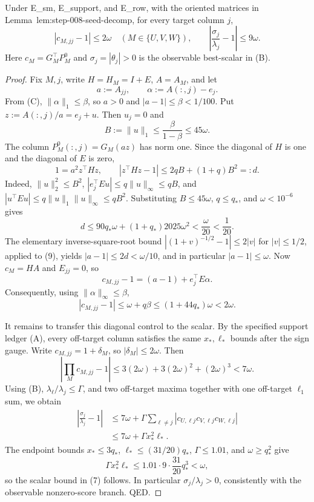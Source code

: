 \begin{lemma}\label{lem:step-008-best-scalar}
Under
E\_sm, E\_support, and E\_row, with the oriented matrices in
Lemma~lem:step-008-seed-decomp, for every target column $j$,
\[
 |c_{M,jj}-1|\le2\omega\quad(M\in\{U,V,W\}),\qquad
 \left|\frac{\sigma_j}{\lambda_j}-1\right|\le9\omega. \tag{7}
\]
Here $c_M=G_M^\top P_M^0$ and $\sigma_j=|\theta_j|>0$ is the observable
best-scalar in (B).

\begin{proof}

Fix $M,j$, write $H=H_M=I+E$, $A=A_M$, and let
\[
 a:=A_{jj},\qquad \alpha:=A(:,j)-e_j.
\]
From (C), $\|\alpha\|_1\le\beta$, so $a>0$ and
$|a-1|\le\beta<1/100$. Put $z:=A(:,j)/a=e_j+u$. Then $u_j=0$ and
\[
 B:=\|u\|_1\le\frac{\beta}{1-\beta}\le45\omega. \tag{8}
\]
The column $P_M^0(:,j)=G_M(az)$ has norm one. Since the diagonal of $H$
is one and the diagonal of $E$ is zero,
\[
 1=a^2 z^\top H z,\qquad
 |z^\top H z-1|\le2qB+(1+q)B^2=:d. \tag{9}
\]
Indeed, $\|u\|_2^2\le B^2$, $|e_j^\top Eu|\le q\|u\|_\infty\le qB$,
and $|u^\top Eu|\le q\|u\|_1\|u\|_\infty\le qB^2$. Substituting
$B\le45\omega$, $q\le q_*$, and $\omega<10^{-6}$ gives
\[
 d\le90q_*\omega+(1+q_*)2025\omega^2<\frac{\omega}{20}<\frac1{20}. \tag{10}
\]
The elementary inverse-square-root bound
$|(1+v)^{-1/2}-1|\le2|v|$ for $|v|\le1/2$, applied to (9), yields
$|a-1|\le2d<\omega/10$, and in particular $|a-1|\le\omega$. Now
$c_M=HA$ and $E_{jj}=0$, so
\[
 c_{M,jj}-1=(a-1)+e_j^\top E\alpha.
\]
Consequently, using $\|\alpha\|_\infty\le\beta$,
\[
 |c_{M,jj}-1|\le\omega+q\beta
 \le(1+44q_*)\omega<2\omega. \tag{11}
\]

It remains to transfer this diagonal control to the scalar. By the specified support ledger (A), every off-target column satisfies the same $x_*,\ell_*$
bounds after the sign gauge. Write $c_{M,jj}=1+\delta_M$, so
$|\delta_M|\le2\omega$. Then
\[
 \left|\prod_M c_{M,jj}-1\right|
 \le3(2\omega)+3(2\omega)^2+(2\omega)^3
 <7\omega. \tag{12}
\]
Using (B), $\lambda_\ell/\lambda_j\le\Gamma$, and two off-target maxima
together with one off-target $\ell_1$ sum, we obtain
\[
\begin{aligned}
 \left|\frac{\sigma_j}{\lambda_j}-1\right|
 &\le 7\omega+
 \Gamma\sum_{\ell\ne j}
 |c_{U,\ell j}c_{V,\ell j}c_{W,\ell j}|\\
 &\le 7\omega+\Gamma x_*^2\ell_*.
\end{aligned} \tag{13}
\]
The endpoint bounds $x_*\le3q_*$, $\ell_*\le(31/20)q_*$,
$\Gamma\le1.01$, and $\omega\ge q_*^2$ give
\[
 \Gamma x_*^2\ell_*
 \le1.01\cdot9\cdot\frac{31}{20}q_*^3
 <\omega, \tag{14}
\]
so the scalar bound in (7) follows. In particular
$\sigma_j/\lambda_j>0$, consistently with the observable nonzero-score
branch. QED.


\end{proof}
\end{lemma}
